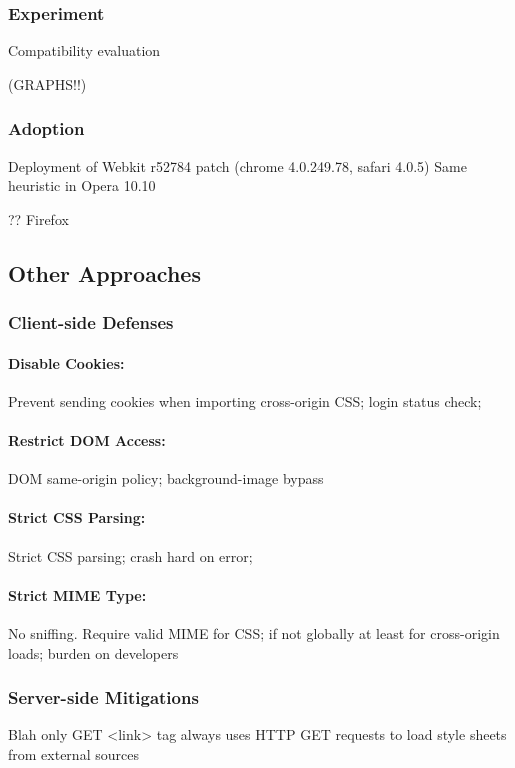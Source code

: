 \documentclass{acm_proc_article-sp}
\begin{document}
\subsubsection{Experiment}
Compatibility evaluation

(GRAPHS!!)

\subsubsection{Adoption}
Deployment of Webkit r52784 patch (chrome 4.0.249.78, safari 4.0.5)
Same heuristic in Opera 10.10

?? Firefox

\subsection{Other Approaches}

\subsubsection{Client-side Defenses}
\paragraph{Disable Cookies:}
Prevent sending cookies when importing cross-origin CSS;
login status check;

\paragraph{Restrict DOM Access:}
DOM same-origin policy;
background-image bypass

\paragraph{Strict CSS Parsing:}
Strict CSS parsing;
crash hard on error;

\paragraph{Strict MIME Type:}
No sniffing. Require valid MIME for CSS; if not globally at least for cross-origin loads;
burden on developers

\subsubsection{Server-side Mitigations}
Blah
only GET
<link> tag always uses HTTP GET requests to load style sheets from external sources
\end{document}
